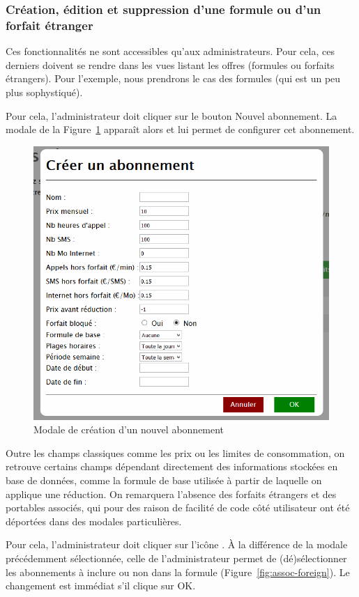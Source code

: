\subsubsection{Création, édition et suppression d'une formule ou d'un forfait étranger}
Ces fonctionnalités ne sont accessibles qu'aux administrateurs. Pour cela, ces derniers doivent se rendre dans les vues listant les offres (formules ou forfaits étrangers). Pour l'exemple, nous prendrons le cas des formules (qui est un peu plus sophystiqué).

Pour cela, l'administrateur doit cliquer sur le bouton \og Nouvel abonnement\fg. La modale de la Figure~\ref{fig:nouvel-abonnement} apparaît alors et lui permet de configurer cet abonnement.

\begin{figure}[ht]
  \centering
  \includegraphics[width=.6\textwidth]{images/Plateforme/nouvel-abonnement}
  \caption{Modale de création d'un nouvel abonnement}
  \label{fig:nouvel-abonnement}
\end{figure}

Outre les champs classiques comme les prix ou les limites de consommation, on retrouve certains champs dépendant directement des informations stockées en base de données, comme la formule de base utilisée à partir de laquelle on applique une réduction. On remarquera l'absence des forfaits étrangers et des portables associés, qui pour des raison de facilité de code côté utilisateur ont été déportées dans des modales particulières.

Pour cela, l'administrateur doit cliquer sur l'icône \faGlobe. À la différence de la modale précédemment sélectionnée, celle de l'administrateur permet de (dé)sélectionner les abonnements à inclure ou non dans la formule (Figure~\ref{fig:assoc-foreign}). Le changement est immédiat s'il clique sur \og OK\fg.

